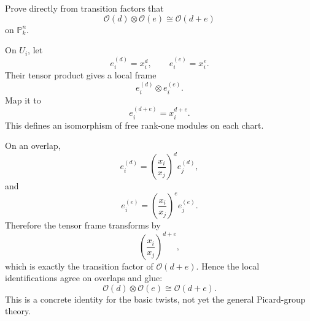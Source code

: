 \begin{problem}\label{prob:vi36-18}
Prove directly from transition factors that
\[
\mathcal O(d)\otimes\mathcal O(e)\cong\mathcal O(d+e)
\]
on \(\mathbb P^n_k\).

\end{problem}

\ifdefined\FullProblemDossiers
\begin{solution}
On \(U_i\), let
\[
e_i^{(d)}=x_i^d,
\qquad
e_i^{(e)}=x_i^e.
\]
Their tensor product gives a local frame
\[
e_i^{(d)}\otimes e_i^{(e)}.
\]
Map it to
\[
e_i^{(d+e)}=x_i^{d+e}.
\]
This defines an isomorphism of free rank-one modules on each chart.

On an overlap,
\[
e_i^{(d)}
=
\left(\frac{x_i}{x_j}\right)^d e_j^{(d)},
\]
and
\[
e_i^{(e)}
=
\left(\frac{x_i}{x_j}\right)^e e_j^{(e)}.
\]
Therefore the tensor frame transforms by
\[
\left(\frac{x_i}{x_j}\right)^{d+e},
\]
which is exactly the transition factor of \(\mathcal O(d+e)\). Hence the local identifications agree on overlaps and
glue:
\[
\boxed{
\mathcal O(d)\otimes\mathcal O(e)\cong\mathcal O(d+e).
}
\]
This is a concrete identity for the basic twists, not yet the general Picard-group theory.
\end{solution}
\fi
